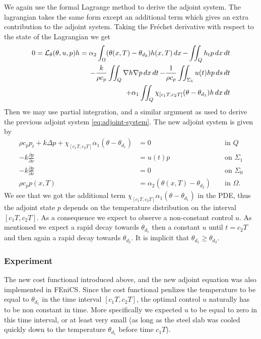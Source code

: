 We again use the formal Lagrange method to derive the adjoint system. The lagrangian takes the same form except an additional term which gives an extra contribution to the adjoint system. Taking the Fréchet derivative with respect to the state of the Lagrangian we get
\begin{equation}
  \begin{aligned}
  0 = \mathcal{L}_\theta(\theta, u, p)h = \alpha_2 \int_\Omega (\theta(x,T) - \theta_{d_2})h(x, T)\mathop{dx} - \iint_Q h_t p\mathop{dx}\mathop{dt} \\
  - \frac{k}{\rho c_p}\iint_Q\nabla h\nabla p \mathop{dx}\mathop{dt}
  - \frac{1}{\rho c_p}\iint_{\Sigma_1} u(t)h p\mathop{ds}\mathop{dt} \\
  + \alpha_1 \iint_{Q}\chi_{[c_1T,c_2T]}(\theta - \theta_{d_1})h \mathop{dx}\mathop{dt}
  \end{aligned}
\end{equation}
Then we may use partial integration, and a similar argument as used to derive the previous adjoint system \eqref{eq:adjoint-system}. The new adjoint system is given by 
\begin{subequations}
   \begin{align*} 
      \rho c_p p_t + k\Delta p + \chi_{[c_1T,c_2T]}\alpha_1(\theta - \theta_{d_1})&= 0 &&\textrm{ in } Q  \\
      {-k}\frac{\partial p}{\partial\nu} &= u(t)p &&\textrm{ on } \Sigma_1  \\
      {-k}\frac{\partial p}{\partial\nu} &= 0 &&\textrm{ on } \Sigma_0  \\
      \rho c_p p(x, T) &= \alpha_2(\theta(x, T) - \theta_{d_2})  &&\textrm{ in } \Omega.
   \end{align*}
\end{subequations}
We see that we got the additional term $\chi_{[c_1T,c_2T]}\alpha_1(\theta-\theta_{d_1})$ in the PDE, thus the adjoint state $p$ depends on the temperature distribution on the interval $[c_1T,c_2T]$. As a consequence we expect to observe a non-constant control $u$. As mentioned we expect a rapid decay towards $\theta_{d_1}$ then a constant $u$ until $t=c_2T$ and then again a rapid decay towards $\theta_{d_2}$. 
It is implicit that $\theta_{d_1} \geq \theta_{d_2}$.

\subsubsection{Experiment}

The new cost functional introduced above, and the new adjoint equation was also implemented in FEniCS. Since the cost functional penlizes the temperature to be equal to $\theta_{d_1}$ in the time interval $[c_1 T, c_2 T]$, the optimal control $u$ naturally has to be non constant in time. More specifically we expected $u$ to be equal to zero in this time interval, or at least very small (as long as the steel slab was cooled quickly down to the temperature $\theta_{d_1}$ before time $c_1 T$). 

